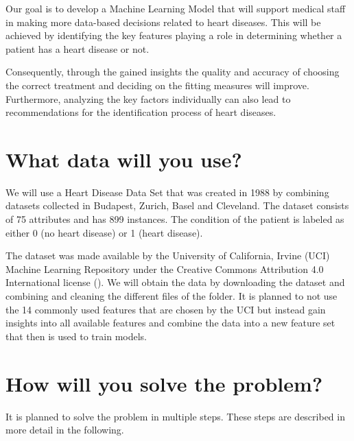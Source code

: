 \documentclass[11pt,titlepage,oneside,openany]{book}
\begin{document}
Our goal is to develop a Machine Learning Model that will support medical staff in making more data-based decisions related to heart diseases. This will be achieved by identifying the key features playing a role in determining whether a patient has a heart disease or not. 

Consequently, through the gained insights the quality and accuracy of choosing the correct treatment and deciding on the fitting measures will improve. Furthermore, analyzing the key factors individually can also lead to recommendations for the identification process of heart diseases. 


\section{What data will you use?}
\label{sec:data}

We will use a Heart Disease Data Set that was created in 1988 by combining datasets collected in Budapest, Zurich, Basel and Cleveland. The dataset consists of 75 attributes and has 899 instances. The condition of the patient is labeled as either 0 (no heart disease) or 1 (heart disease).

The dataset was made available by the University of California, Irvine (UCI) Machine Learning Repository under the Creative Commons Attribution 4.0 International license (\cite{janosi1988}). We will obtain the data by downloading the dataset and combining and cleaning the different files of the folder. It is planned to not use the 14 commonly used features that are chosen by the UCI but instead gain insights into all available features and combine the data into a new feature set that then is used to train models. 

\section{How will you solve the problem?}
\label{cha:solve}

It is planned to solve the problem in multiple steps. These steps are described in more detail in the following. 
\end{document}
